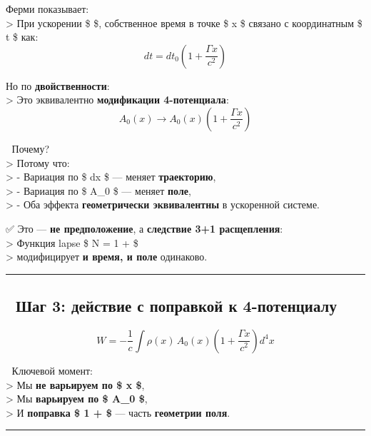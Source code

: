 \documentclass[11pt]{article}
\begin{document}
Ферми показывает:\\
\textgreater{} При ускорении \$ \Gamma \$, собственное время в точке \$
x \$ связано с координатным \$ t \$ как:\\
\[
dt = dt_0 \left( 1 + \frac{\Gamma x}{c^2} \right)
\]

Но по \textbf{двойственности}:\\
\textgreater{} Это эквивалентно \textbf{модификации 4-потенциала}:\\
\[
\boxed{
A_0(x) \to A_0(x) \left( 1 + \frac{\Gamma x}{c^2} \right)
}
\]

📌 Почему?\\
\textgreater{} Потому что:\\
\textgreater{} - Вариация по \$ dx \$ --- меняет \textbf{траекторию},\\
\textgreater{} - Вариация по \$ A\_0 \$ --- меняет \textbf{поле},\\
\textgreater{} - Оба эффекта \textbf{геометрически эквивалентны} в
ускоренной системе.

✅ Это --- \textbf{не предположение}, а \textbf{следствие 3+1
расщепления}:\\
\textgreater{} Функция lapse \$ N = 1 +  \$\\
\textgreater{} модифицирует \textbf{и время, и поле} одинаково.

\begin{center}\rule{0.5\linewidth}{\linethickness}\end{center}

\subsection{🔹 Шаг 3: действие с поправкой к
4-потенциалу}\label{ux448ux430ux433-3-ux434ux435ux439ux441ux442ux432ux438ux435-ux441-ux43fux43eux43fux440ux430ux432ux43aux43eux439-ux43a-4-ux43fux43eux442ux435ux43dux446ux438ux430ux43bux443}

\[
\boxed{
W = -\frac{1}{c} \int \rho(x) \, A_0(x) \left( 1 + \frac{\Gamma x}{c^2} \right) d^4x
}
\]

📌 Ключевой момент:\\
\textgreater{} Мы \textbf{не варьируем по \$ x \$},\\
\textgreater{} Мы \textbf{варьируем по \$ A\_0 \$},\\
\textgreater{} И \textbf{поправка \$ 1 +  \$} ---
часть \textbf{геометрии поля}.

\begin{center}\rule{0.5\linewidth}{\linethickness}\end{center}
\end{document}
